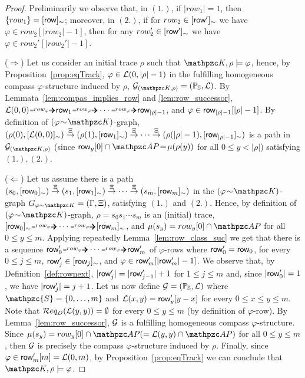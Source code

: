 \begin{proof}
Preliminarily we observe that, in $(1.)$, if $|row_1|=1$, then $\{row_1\}=[\text{{\sffamily row}}]_\sim$; moreover, in $(2.)$, if for $row_2\in[\text{{\sffamily row}}']_\sim$ we have $\varphi\in row_2[|row_2|-1]$, then for any $row_2'\in[\text{{\sffamily row}}']_\sim$ we have $\varphi\in row_2'[|row_2'|-1]$.

($\Rightarrow$) 
Let us consider an initial trace $\rho$ such that $\Ku,\rho\models\varphi$, hence, by Proposition~\ref{prop:eqTrack}, 
$\varphi\in\mathcal{L}(0,|\rho|-1)$ in the fulfilling homogeneous compass $\varphi$-structure induced by $\rho$, $\cG_{(\Ku,\rho)}=(\bbP_\bbD, \cL)$.
%
By Lemmata~\ref{lem:compas_implies_row} and \ref{lem:row_successor}, 
$\cL(0,0) \rownext \allowbreak  \row_1 \rownext \cdots \rownext \row_{|\rho|-1}$, and $\varphi \in \text{{\sffamily row}}_{|\rho|-1}[|\rho|-1]$. 
By definition of $(\varphi\!\sim\!\Ku)$-graph, 
$(\rho(0),[\mathcal{L}(0,0)]_\sim) \stackrel{\Xi}{\rightarrow} (\rho(1),[\text{{\sffamily row}}_1]_\sim) \stackrel{\Xi}{\rightarrow} \cdots \stackrel{\Xi}{\rightarrow} (\rho(|\rho|-1),[\text{{\sffamily row}}_{|\rho|-1}]_\sim)$ is a path in $\cG_{(\Ku,\rho)}$ (since $\row_y[0]\cap\AP\!=\!\Lab(\rho(y))$ for all $0\!\leq\! y\!<\!|\rho|$) satisfying $(1.),(2.)$.

($\Leftarrow$) Let us assume there  is a path $(s_0,[\text{{\sffamily row}}_0]_\sim) \stackrel{\Xi}{\rightarrow} (s_1,[\text{{\sffamily row}}_1]_\sim) \stackrel{\Xi}{\rightarrow} \cdots \stackrel{\Xi}{\rightarrow} (s_m,[\text{{\sffamily row}}_m]_\sim)$
in the $(\varphi\!\sim\!\Ku)$-graph $G_{\varphi \sim\Ku}=(\Gamma, \Xi)$, satisfying $(1.)$ and $(2.)$.
Hence, by definition of $(\varphi\!\sim\!\Ku)$-graph, $\rho\!=\!s_0s_1\cdots s_m$ is an (initial) trace,  $[\row_0]_\sim \rownext \allowbreak \cdots \rownext [\row_{m}]_\sim$, and $\Lab(s_y)=row_y[0]\cap\AP$ for all $0\leq y\leq m$.
%
Applying repeatedly Lemma~\ref{lem:row_class_suc}
we get that there is a sequence 
$\row'_0 \rownext \cdots \rownext \row'_{m}$ of $\varphi$-rows where $\text{{\sffamily row}}'_0 =\text{{\sffamily row}}_0$,
for every $0\leq j\leq m$, $\text{{\sffamily row}}'_j\in [\text{{\sffamily row}}_j]_\sim$,
and $\varphi\in \text{{\sffamily row}}_m'[|\text{{\sffamily row}}_m'|-1]$.
%
We observe that, by Definition~\ref{def:rownext},
$|\text{{\sffamily row}}_j'|=|\text{{\sffamily row}}_{j-1}'|+1$
 for $1\leq j \leq m$
and, since $|\text{{\sffamily row}}'_0|=1$, we have $|\text{{\sffamily row}}_{j}'|= j + 1$. 
%
Let us now define $\mathcal{G}=(\mathbb{P}_{\mathbb{S}}, \mathcal{L})$ where $\mathpzc{S}= \{0,\ldots, m\}$ and
$\mathcal{L}(x,y)=\text{{\sffamily row}}_y'[y-x]$ for every $0\leq x\leq y\leq m$.
Note that $\mathcal{R} eq_D(\mathcal{L}(y,y))=\emptyset$ for every $0\leq y\leq m$ (by definition of $\varphi$-row).
By Lemma~\ref{lem:row_successor}, $\mathcal{G}$ is a fulfilling homogeneous compass $\varphi$-structure.
Since $\Lab(s_y)=row_y[0]\cap\AP(=\cL(y,y)\cap\AP)$ for all $0\leq y\leq m$, then $\mathcal{G}$ is precisely the compass $\varphi$-structure induced by $\rho$.
Finally, since $\varphi\in \text{{\sffamily row}}_m'[m]=\mathcal{L}(0,m)$, by Proposition~\ref{prop:eqTrack} we can conclude that $\Ku,\rho\models\varphi$.
\end{proof}


